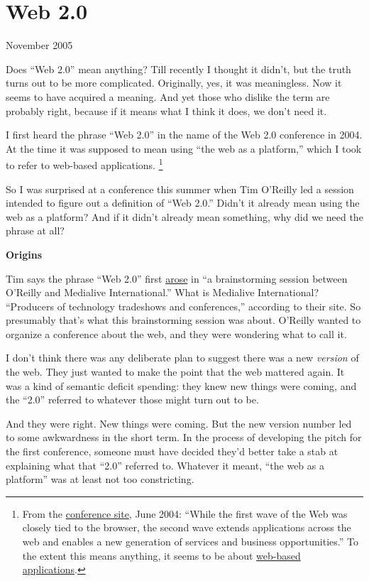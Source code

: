\chapter{Web 2.0}

November 2005

Does ``Web 2.0'' mean anything? Till recently I thought it didn't, but
the truth turns out to be more complicated. Originally, yes, it was
meaningless. Now it seems to have acquired a meaning. And yet those who
dislike the term are probably right, because if it means what I think it
does, we don't need it.

I first heard the phrase ``Web 2.0'' in the name of the Web 2.0
conference in 2004. At the time it was supposed to mean using ``the web
as a platform,'' which I took to refer to web-based applications.
\footnote{From the
\href{http://web.archive.org/web/20040602111547/http://web2con.com/}{conference
site}, June 2004: ``While the first wave of the Web was closely tied to
the browser, the second wave extends applications across the web and
enables a new generation of services and business opportunities.'' To
the extent this means anything, it seems to be about
\href{road.html}{web-based applications}.}

So I was surprised at a conference this summer when Tim O'Reilly led a
session intended to figure out a definition of ``Web 2.0.'' Didn't it
already mean using the web as a platform? And if it didn't already mean
something, why did we need the phrase at all?

\textbf{Origins}

Tim says the phrase ``Web 2.0'' first
\href{http://www.oreillynet.com/pub/a/oreilly/tim/news/2005/09/30/what-is-web-20\%20.html}{arose}
in ``a brainstorming session between O'Reilly and Medialive
International.'' What is Medialive International? ``Producers of
technology tradeshows and conferences,'' according to their site. So
presumably that's what this brainstorming session was about. O'Reilly
wanted to organize a conference about the web, and they were wondering
what to call it.

I don't think there was any deliberate plan to suggest there was a new
\emph{version} of the web. They just wanted to make the point that the
web mattered again. It was a kind of semantic deficit spending: they
knew new things were coming, and the ``2.0'' referred to whatever those
might turn out to be.

And they were right. New things were coming. But the new version number
led to some awkwardness in the short term. In the process of developing
the pitch for the first conference, someone must have decided they'd
better take a stab at explaining what that ``2.0'' referred to. Whatever
it meant, ``the web as a platform'' was at least not too constricting.

